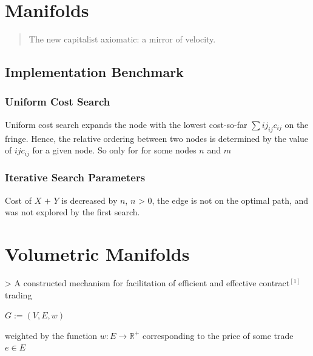 \newpage



\chapter{Manifolds}


\begin{quote}
     The new capitalist axiomatic: a mirror of velocity.
\end{quote}


\section{Implementation Benchmark}

\subsection{Uniform Cost Search}
Uniform cost search expands the node with the lowest cost-so-far 
$\sum{i j}_{i j} c_{i j}$ on the fringe. Hence, the relative ordering between two nodes is determined by the value of \sum${i j} c_{i j}$ for a given node. So only for  for some nodes $n$ and $m$ $ $

\subsection{Iterative Search Parameters}

Cost of $X$ $+$ $Y$ is decreased by $n$, $n$ > $0$, the edge is not on the optimal path, and was not explored by
the first search.



\newpage

\chapter{Volumetric Manifolds}

> A constructed mechanism for facilitation of efficient and effective contract$^[1]$ trading 

$
G:=(V, E, w)
$



weighted by the function $w: E \rightarrow \mathbb{R}^{+}$ corresponding to the price of some trade $e \in E$


